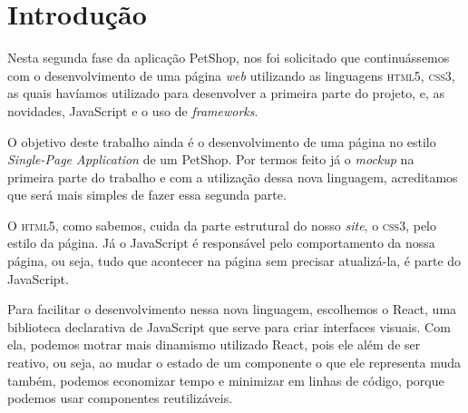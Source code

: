 \chapter{Introdução}

Nesta segunda fase da aplicação PetShop, nos foi solicitado que
continuássemos com o desenvolvimento de uma página \emph{web} utilizando as
linguagens \textsc{html5}, \textsc{css3}, as quais havíamos utilizado para
desenvolver a primeira parte do projeto, e, as novidades, JavaScript e o uso de
\emph{frameworks}.

O objetivo deste trabalho ainda é o desenvolvimento de uma página no estilo
\emph{Single-Page Application} de um PetShop. Por termos feito já o
\emph{mockup} na primeira parte do trabalho e com a utilização dessa nova
linguagem, acreditamos que será mais simples de fazer essa segunda parte.

O \textsc{html5}, como sabemos, cuida da parte estrutural do nosso \emph{site},
o \textsc{css3}, pelo estilo da página. Já o JavaScript é responsável pelo
comportamento da nossa página, ou seja, tudo que acontecer na página sem
precisar atualizá-la, é parte do JavaScript.

Para facilitar o desenvolvimento nessa nova linguagem, escolhemos o React, uma
biblioteca declarativa de JavaScript que serve para criar interfaces visuais.
Com ela, podemos motrar mais dinamismo utilizado React, pois ele além de ser
reativo, ou seja, ao mudar o estado de um componente o que ele representa muda
também, podemos economizar tempo e minimizar em linhas de código, porque
podemos usar componentes reutilizáveis.
